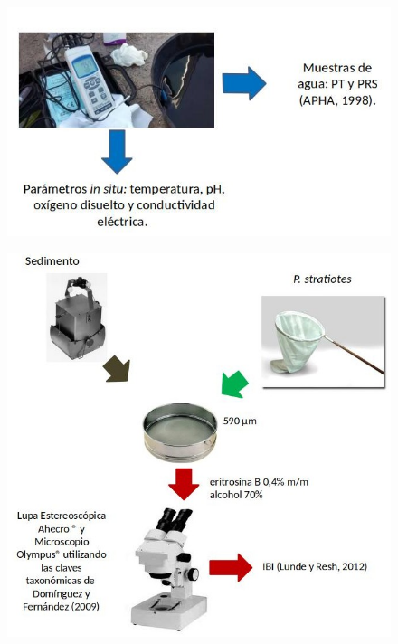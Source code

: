 \documentclass[final]{beamer}
\newlength{\onecolwid}
\begin{document}
\begin{frame}[t]
\begin{columns}[t]
\begin{column}{\onecolwid}
           \begin{multicols}{2}
                \begin{figure}
                	\vspace*{-0.90cm}
                    \includegraphics[width=0.9\linewidth]{met.jpg}
				\end{figure}
                \begin{figure}
                	\vspace*{-0.90cm}
                    \includegraphics[width=1.1\linewidth]{met2.jpg}
				\end{figure}
                \end{multicols}
          

\end{column}
\end{columns}
\end{frame}
\end{document}
